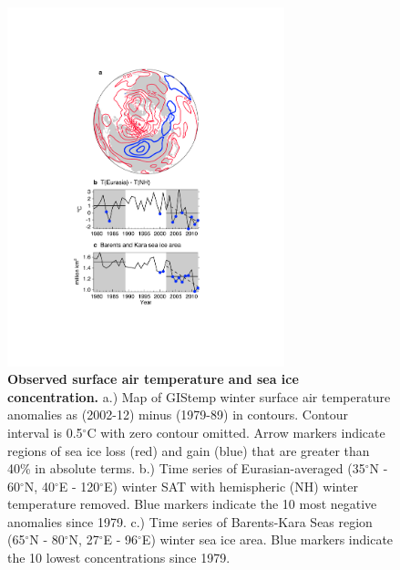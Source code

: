 \documentclass{nature}
\begin{document}
\begin{figure}%
\centering
\noindent\includegraphics[width=19pc]{PLOT1.pdf}
\caption{\textbf{Observed surface air temperature and sea ice concentration.} a.) Map of GIStemp winter surface air temperature anomalies as (2002-12) minus (1979-89) in contours. Contour interval is 0.5$^\circ$C with zero contour omitted. Arrow markers indicate regions of sea ice loss (red) and gain (blue) that are greater than 40\% in absolute terms. b.) Time series of Eurasian-averaged (35$^\circ$N - 60$^\circ$N, 40$^\circ$E - 120$^\circ$E) winter SAT with hemispheric (NH) winter temperature removed. Blue markers indicate the 10 most negative anomalies since 1979. c.) Time series of Barents-Kara Seas region (65$^\circ$N - 80$^\circ$N, 27$^\circ$E - 96$^\circ$E) winter sea ice area. Blue markers indicate the 10 lowest concentrations since 1979.
}
\label{fig:fig1} 
\end{figure}
\end{document}
